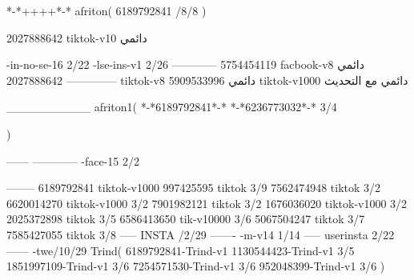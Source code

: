 *-*++++*-*
afriton(
6189792841 /8/8
)

2027888642 tiktok-v10
دائمي

-in-no-se-16 2/22
-lse-ins-v1 2/26
------------
5754454119 facbook-v8
دائمي
--------------
2027888642 tiktok-v8
دائمي
5909533996 tiktok-v1000
دائمي مع التحديث

__________
afriton1(
*-*6189792841*-*
*-*6236773032*-* 3/4

)


------
------------
-face-15 2/2

--------
6189792841 tiktok-v1000
997425595 tiktok 3/9
7562474948 tiktok 3/2
6620014270 tiktok-v1000 3/2
7901982121 tiktok 3/2
1676036020 tiktok-v1000 3/2
2025372898 tiktok  3/5
6586413650 tik-v10000 3/6
5067504247 tiktok 3/7
7585427055 tiktok 3/8
-----
 INSTA /2/29
-------
-m-v14 1/14
-----
userinsta 2/22
------
-twe/10/29
Trind(
6189792841-Trind-v1 
1130544423-Trind-v1 3/5
1851997109-Trind-v1 3/6
7254571530-Trind-v1 3/6
952048399-Trind-v1 3/6
)
